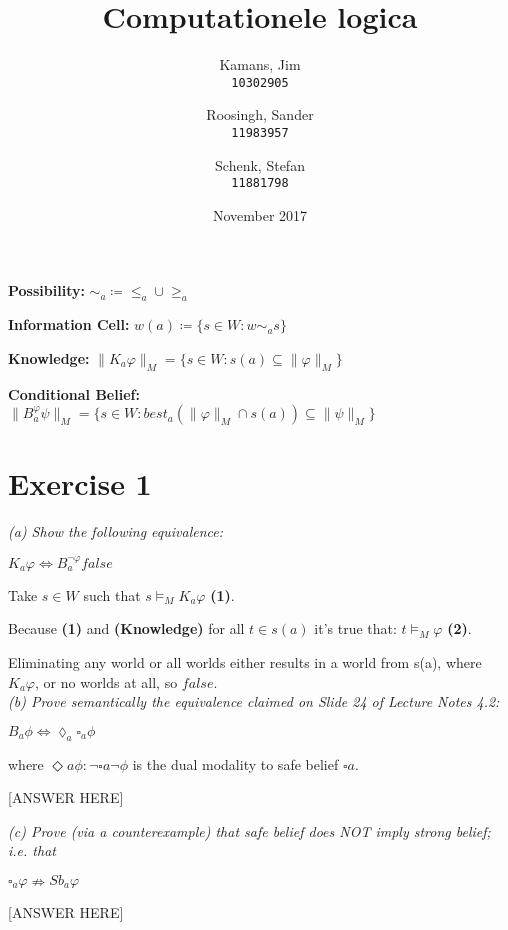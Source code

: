 \documentclass[leqno]{article}
\title{Computationele logica}
\author{
    Kamans, Jim\\
    \texttt{10302905}
    \and
    Roosingh, Sander\\
    \texttt{11983957}
    \and
    Schenk, Stefan\\
    \texttt{11881798}
}
\date{November 2017}
\begin{document}
\maketitle

\textbf{Possibility:} $\sim_a \coloneqq \leq_a \cup \geq_a$

\textbf{Information Cell:} $w(a) \coloneqq \{s\in W:w\sim_a s\}$

\textbf{Knowledge:} $\lVert K_a \varphi \rVert_M = \{s\in W:s(a) \subseteq
\lVert \varphi \rVert_M\}$

\textbf{Conditional Belief:} $\lVert B_a^\varphi \psi \rVert_M = \{s \in
W:best_a(\lVert\varphi\rVert_M \cap s(a)) \subseteq \lVert\psi\rVert_M\}$ \\


\section*{Exercise 1}

\textit{(a) Show the following equivalence:}
\begin{center}
    $K_a \varphi \Leftrightarrow B_a^{\neg \varphi} false$
\end{center}

Take $s \in W$ such that $s \models_M K_a \varphi$ \textbf{(1)}.

Because \textbf{(1)} and \textbf{(Knowledge)} for all $t \in s(a)$ it's true
that: $t \models_M \varphi$ \textbf{(2)}.

Eliminating any world or all worlds either results in a world from s(a), where $K_a \varphi$, or no worlds at all, so $false$. \\


\textit{(b) Prove semantically the equivalence claimed on Slide 24 of Lecture
Notes 4.2:}
\begin{center}
    $B_a \phi \Leftrightarrow \lozenge_a \square_a \phi$
\end{center}
where $\Diamond a \phi : \neg \square a \neg \phi$ is the dual modality to safe
belief $\square a$.

[ANSWER HERE]

\textit{(c) Prove (via a counterexample) that safe belief does NOT imply strong
belief; i.e. that}
\begin{center}
    $\square_a \varphi \nRightarrow Sb_a \varphi$
\end{center}

[ANSWER HERE]
\end{document}
